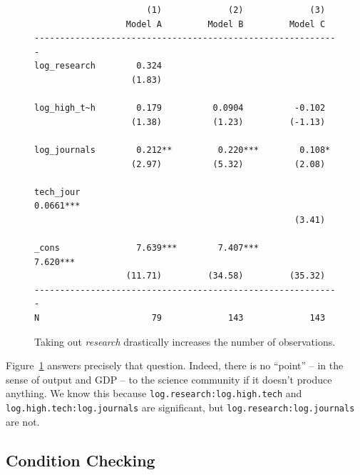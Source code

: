 \documentclass[11pt]{article}
\begin{document}
\begin{figure}[!ht]
\begin{singlespace}
\small
\begin{verbatim}
                      (1)             (2)             (3)
                  Model A         Model B         Model C
------------------------------------------------------------
log_research        0.324
                   (1.83)

log_high_t~h        0.179          0.0904          -0.102
                   (1.38)          (1.23)         (-1.13)

log_journals        0.212**         0.220***        0.108*
                   (2.97)          (5.32)          (2.08)

tech_jour                                          0.0661***
                                                   (3.41)

_cons               7.639***        7.407***        7.620***
                  (11.71)         (34.58)         (35.32)
------------------------------------------------------------
N                      79             143             143
\end{verbatim}
\end{singlespace}
\caption{\label{science_model_regressions}Taking out \emph{research} drastically increases the number of observations.}
\end{figure}

Figure~\ref{science_model_regressions} answers precisely that question. Indeed, there is no ``point'' -- in the sense of output and GDP -- to the science community if it doesn't produce anything. We know this because {\tt log.research:log.high.tech} and {\tt log.high.tech:log.journals} are significant, but {\tt log.research:log.journals} are not. %


\subsection{Condition Checking}
\end{document}
